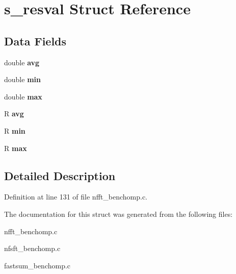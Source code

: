 \hypertarget{structs__resval}{\section{s\-\_\-resval Struct Reference}
\label{structs__resval}
}
\subsection*{Data Fields}
\begin{DoxyCompactItemize}
\item 
\hypertarget{structs__resval_aa7c46309a88aba50fd63402037d8dd3e}{double {\bfseries avg}}\label{structs__resval_aa7c46309a88aba50fd63402037d8dd3e}

\item 
\hypertarget{structs__resval_a70afc1842566eb54e7519287c3d073be}{double {\bfseries min}}\label{structs__resval_a70afc1842566eb54e7519287c3d073be}

\item 
\hypertarget{structs__resval_a5b114ea67a970f09f68257e35b549dac}{double {\bfseries max}}\label{structs__resval_a5b114ea67a970f09f68257e35b549dac}

\item 
\hypertarget{structs__resval_aac4974fc0fd84cee7f01550c228f132a}{R {\bfseries avg}}\label{structs__resval_aac4974fc0fd84cee7f01550c228f132a}

\item 
\hypertarget{structs__resval_a9e485c7f8cd1aef23f92b0ca86b3eba4}{R {\bfseries min}}\label{structs__resval_a9e485c7f8cd1aef23f92b0ca86b3eba4}

\item 
\hypertarget{structs__resval_a7d9f946d04760077f508dcaf5e41c99f}{R {\bfseries max}}\label{structs__resval_a7d9f946d04760077f508dcaf5e41c99f}

\end{DoxyCompactItemize}


\subsection{Detailed Description}


Definition at line 131 of file nfft\-\_\-benchomp.\-c.



The documentation for this struct was generated from the following files\-:\begin{DoxyCompactItemize}
\item 
nfft\-\_\-benchomp.\-c\item 
nfsft\-\_\-benchomp.\-c\item 
fastsum\-\_\-benchomp.\-c\end{DoxyCompactItemize}
